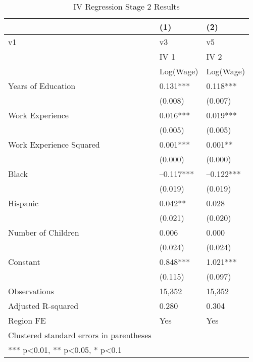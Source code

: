 \documentclass{article}
\begin{document}
\begin{table}[tbp] \centering
{}

\caption{IV Regression Stage 2 Results}
\begin{tabularx}{\linewidth}{@{}lCC@{}}

\toprule
&{(1)}&{(2)} \tabularnewline \midrule
{v1}&{v3}&{v5} \tabularnewline
\midrule \addlinespace[\belowrulesep]
&IV 1&IV 2 \tabularnewline
&Log(Wage)&Log(Wage) \tabularnewline
\midrule Years of Education&0.131***&0.118*** \tabularnewline
&(0.008)&(0.007) \tabularnewline
Work Experience&0.016***&0.019*** \tabularnewline
&(0.005)&(0.005) \tabularnewline
Work Experience Squared&0.001***&0.001** \tabularnewline
&(0.000)&(0.000) \tabularnewline
Black&--0.117***&--0.122*** \tabularnewline
&(0.019)&(0.019) \tabularnewline
Hispanic&0.042**&0.028 \tabularnewline
&(0.021)&(0.020) \tabularnewline
Number of Children&0.006&0.000 \tabularnewline
&(0.024)&(0.024) \tabularnewline
Constant&0.848***&1.021*** \tabularnewline
&(0.115)&(0.097) \tabularnewline
\midrule Observations&15,352&15,352 \tabularnewline
Adjusted R-squared&0.280&0.304 \tabularnewline
Region FE&Yes&Yes \tabularnewline
Clustered standard errors in parentheses&& \tabularnewline
*** p<0.01, ** p<0.05, * p<0.1&& \tabularnewline
\bottomrule 

\end{tabularx}
\end{table}
\end{document}

